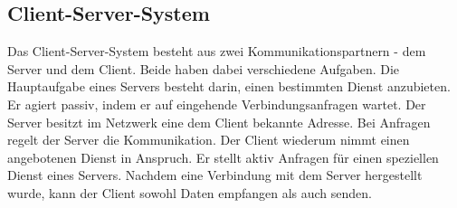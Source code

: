 \documentclass[12pt,a4paper]{report}
\begin{document}
\subsection{Client-Server-System}\label{subsec:Client-Server-Modell}
Das Client-Server-System besteht aus zwei Kommunikationspartnern - dem Server und dem Client. Beide haben dabei verschiedene Aufgaben. Die Hauptaufgabe eines Servers besteht darin, einen bestimmten Dienst anzubieten. Er agiert passiv, indem er auf eingehende Verbindungsanfragen wartet. Der Server besitzt im Netzwerk eine dem Client bekannte Adresse. Bei Anfragen regelt der Server die Kommunikation. Der Client wiederum nimmt einen angebotenen Dienst in Anspruch. Er stellt aktiv Anfragen für einen speziellen Dienst eines Servers. Nachdem eine Verbindung mit dem Server hergestellt wurde, kann der Client sowohl Daten empfangen als auch senden.
\end{document}
